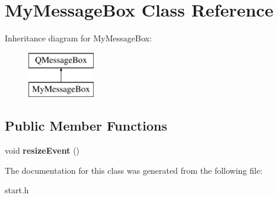 \hypertarget{class_my_message_box}{\section{My\-Message\-Box Class Reference}
\label{class_my_message_box}
}
Inheritance diagram for My\-Message\-Box\-:\begin{figure}[H]
\begin{center}
\leavevmode
\includegraphics[height=2.000000cm]{class_my_message_box}
\end{center}
\end{figure}
\subsection*{Public Member Functions}
\begin{DoxyCompactItemize}
\item 
\hypertarget{class_my_message_box_a5f2ebba721994e0b991449265daf55fd}{void {\bfseries resize\-Event} ()}\label{class_my_message_box_a5f2ebba721994e0b991449265daf55fd}

\end{DoxyCompactItemize}


The documentation for this class was generated from the following file\-:\begin{DoxyCompactItemize}
\item 
start.\-h\end{DoxyCompactItemize}
